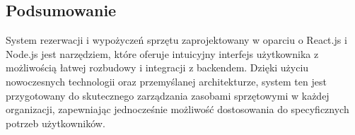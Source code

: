 \documentclass{article}
\begin{document}
\subsection{Podsumowanie}

System rezerwacji i wypożyczeń sprzętu zaprojektowany w oparciu o React.js i Node.js jest narzędziem, które oferuje intuicyjny interfejs użytkownika z możliwością łatwej rozbudowy i integracji z backendem. Dzięki użyciu nowoczesnych technologii oraz przemyślanej architekturze, system ten jest przygotowany do skutecznego zarządzania zasobami sprzętowymi w każdej organizacji, zapewniając jednocześnie możliwość dostosowania do specyficznych potrzeb użytkowników.
\end{document}
